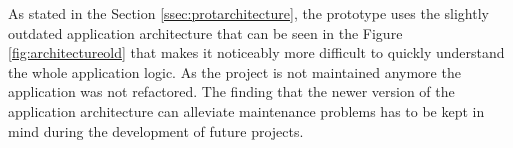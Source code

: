 As stated in the Section \ref{ssec:protarchitecture}, the prototype uses the slightly outdated application architecture that can be seen in the Figure \ref{fig:architectureold} that makes it noticeably more difficult to quickly understand the whole application logic. As the project is not maintained anymore the application was not refactored. The finding that the newer version of the application architecture can alleviate maintenance problems has to be kept in mind during the development of future projects.







